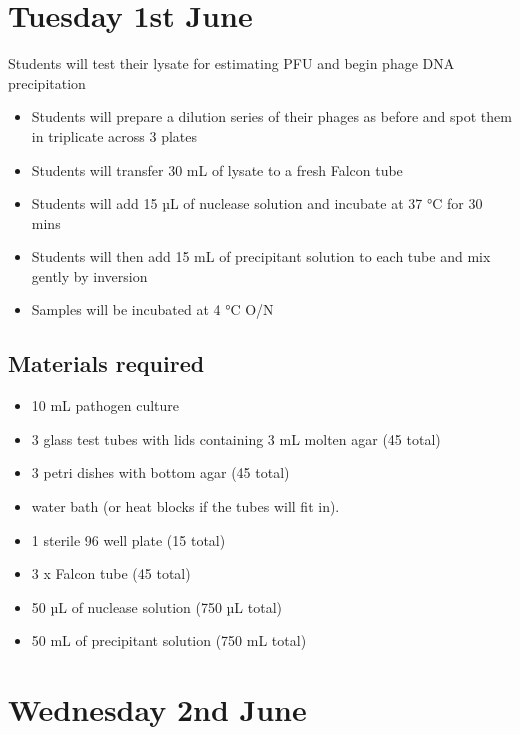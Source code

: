 \documentclass[
]{book}
\providecommand{\tightlist}{%
  \setlength{\itemsep}{0pt}\setlength{\parskip}{0pt}}
\begin{document}
\hypertarget{tuesday-1st-june}{%
\section{Tuesday 1st June}\label{tuesday-1st-june}}

Students will test their lysate for estimating PFU and begin phage DNA precipitation

\begin{itemize}
\tightlist
\item
  Students will prepare a dilution series of their phages as before and spot them in triplicate across 3 plates
\item
  Students will transfer 30 mL of lysate to a fresh Falcon tube
\item
  Students will add 15 µL of nuclease solution and incubate at 37 °C for 30 mins
\item
  Students will then add 15 mL of precipitant solution to each tube and mix gently by inversion
\item
  Samples will be incubated at 4 °C O/N
\end{itemize}

\hypertarget{materials-required-10}{%
\subsection{Materials required}\label{materials-required-10}}

\begin{itemize}
\tightlist
\item
  10 mL pathogen culture
\item
  3 glass test tubes with lids containing 3 mL molten agar (45 total)
\item
  3 petri dishes with bottom agar (45 total)
\item
  water bath (or heat blocks if the tubes will fit in).
\item
  1 sterile 96 well plate (15 total)
\item
  3 x Falcon tube (45 total)
\item
  50 µL of nuclease solution (750 µL total)
\item
  50 mL of precipitant solution (750 mL total)
\end{itemize}

\hypertarget{wednesday-2nd-june}{%
\section{Wednesday 2nd June}\label{wednesday-2nd-june}}
\end{document}
